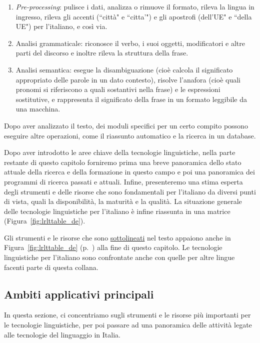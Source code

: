 \documentclass[]{../../metanetpaper}
\begin{document}
\begin{multicols}{2}
\begin{enumerate}
\item \emph{Pre-processing}: pulisce i dati, analizza o rimuove il formato, rileva la lingua in ingresso, rileva gli accenti (“citt\`{a}" e “citta'") e gli apostrofi (dell'UE" e “della UE") per l'italiano, e cos\`{i} via.
\item Analisi grammaticale: riconosce il verbo, i suoi oggetti, modificatori e altre parti del discorso e inoltre rileva la struttura della frase.
\item Analisi semantica: esegue la disambiguazione (cio\`{e} calcola il significato appropriato delle parole in un dato contesto), risolve l'anafora (cio\`{e} quali pronomi si riferiscono a quali sostantivi nella frase) e le espressioni sostitutive, e rappresenta il significato della frase in un formato leggibile da una macchina.
\end{enumerate}

Dopo aver analizzato il testo, dei moduli specifici per un certo compito
possono eseguire altre operazioni, come il riassunto automatico e la ricerca
in un database.

Dopo aver introdotto le aree chiave della tecnologie linguistiche, 
nella parte restante di questo capitolo forniremo
prima una breve panoramica dello stato attuale della ricerca e della
formazione in questo campo e poi una panoramica dei programmi di ricerca
passati e attuali. Infine, presenteremo una stima esperta degli
strumenti e delle risorse che sono fondamentali per l'italiano da diversi
punti di vista, quali la disponibilit\`{a}, la maturit\`{a} e la qualit\`{a}. 
La situazione generale delle tecnologie linguistiche per l'italiano \`{e} 
infine riassunta in una matrice (Figura~\ref{fig:lrlttable_de}).

Gli strumenti e le risorse che sono \underline{sottolineati} nel testo appaiono
anche in  Figura~\ref{fig:lrlttable_de} (p.~\pageref{fig:lrlttable_de}) 
alla fine di questo capitolo. Le tecnologie linguistiche per l'italiano 
sono confrontate anche con quelle per altre lingue facenti parte di questa 
collana.


\subsection{Ambiti applicativi principali} 

In questa sezione, ci concentriamo sugli strumenti e le risorse pi\`{u}
importanti per le tecnologie linguistiche, per poi passare ad una panoramica
delle attivit\`{a} legate alle tecnologie del linguaggio in Italia. 





\end{multicols}
\end{document}
